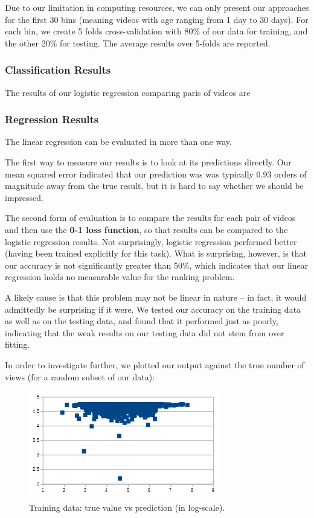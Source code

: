 Due to our limitation in computing resources, we can only present our approaches for the first 30 bins (meaning videos with age ranging from 1 day to 30 days). For each bin, we create 5 folds cross-validation with 80\% of our data for training, and the other 20\% for testing. The average results over 5-folds are reported.

\subsubsection{Classification Results}
	The results of our logistic regression comparing paris of videos are
	
	
\subsubsection{Regression Results}
	The linear regression can be evaluated in more than one way.
	
	The first way to measure our results is to look at its predictions directly.  Our mean squared error indicated that our prediction was was typically 0.93 orders of magnitude away from the true result, but it is hard to say whether we should be impressed.
	
	The second form of evaluation is to compare the results for each pair of videos and then use the \textbf{0-1 loss function}, so that results can be compared to the logistic regression results.  Not surprisingly, logistic regression performed better (having been trained explicitly for this task).  What is surprising, however, is that our accuracy is not significantly greater than 50\%, which indicates that our linear regression holds no measurable value for the ranking problem.
	
	A likely cause is that this problem may not be linear in nature -- in fact, it would admittedly be surprising if it were.  We tested our accuracy on the training data as well as on the testing data, and found that it performed just as poorly, indicating that the weak results on our testing data did not stem from over fitting.
	
	In order to investigate further, we plotted our output against the true number of views (for a random subset of our data):

	\begin{figure}[!h]
		\begin{center}
			\includegraphics[width=.75\textwidth,clip]{logistic regression training.png}
		\end{center}
		\caption{Training data: true value vs prediction (in log-scale).}
		\label{fig:trainingTrueVsPredicted}
	\end{figure}
	
